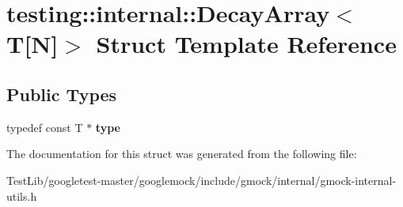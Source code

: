 \hypertarget{structtesting_1_1internal_1_1DecayArray_3_01T[N]_4}{}\section{testing\+:\+:internal\+:\+:Decay\+Array$<$ T\mbox{[}N\mbox{]}$>$ Struct Template Reference}
\label{structtesting_1_1internal_1_1DecayArray_3_01T[N]_4}
\subsection*{Public Types}
\begin{DoxyCompactItemize}
\item 
\mbox{\label{structtesting_1_1internal_1_1DecayArray_3_01T[N]_4_afc22a88da484b94639501c07fb90bfd3}} 
typedef const T $\ast$ {\bfseries type}
\end{DoxyCompactItemize}


The documentation for this struct was generated from the following file\+:\begin{DoxyCompactItemize}
\item 
Test\+Lib/googletest-\/master/googlemock/include/gmock/internal/gmock-\/internal-\/utils.\+h\end{DoxyCompactItemize}
